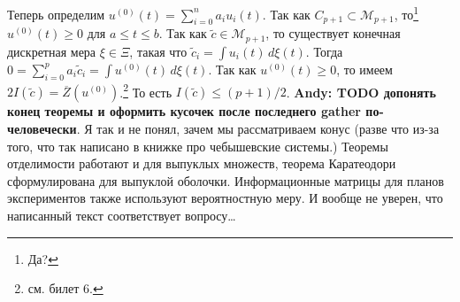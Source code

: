 Теперь определим $u^{(0)}(t) = \sum_{i=0}^n a_i u_i(t)$. Так как $C_{p + 1} \subset \mathcal M_{p + 1}$, то\footnote{Да?} $u^{(0)}(t) \ge 0$ для $a \le t \le b$.
Так как $\tilde c \in \mathcal M_{p + 1}$, то существует конечная дискретная мера $\xi \in \Xi$, такая что $\tilde c_i = \int u_i(t)\, d\xi(t)$.
Тогда $0 = \sum_{i=0}^p a_i \tilde c_i = \int u^{(0)}(t)\,  d\xi(t)$.
Так как $u^{(0)}(t) \ge 0$, то имеем $2 I(\tilde c) = \overline Z(u^{(0)})$.\footnote{см. билет 6.}
То есть $I(\tilde c) \le (p + 1) / 2$.
{ \bf Andy: TODO допонять конец теоремы и оформить кусочек после последнего gather по-человечески}.
{\color{blue} Я так и не понял, зачем мы рассматриваем конус (разве что из-за того, что так написано в книжке про чебышевские системы.) Теоремы отделимости работают и для выпуклых множеств, теорема Каратеодори сформулирована для выпуклой оболочки. Информационные матрицы для планов экспериментов также используют вероятностную меру. И вообще не уверен, что написанный текст соответствует вопросу…}
